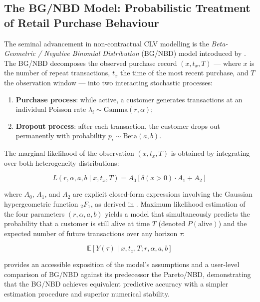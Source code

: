 \subsection{The BG/NBD Model: Probabilistic Treatment of Retail Purchase Behaviour}

The seminal advancement in non-contractual CLV modelling is the \textit{Beta-Geometric / Negative Binomial Distribution} (BG/NBD) model introduced by \cite{FaderHardieLee2005}. The BG/NBD decomposes the observed purchase record $(x, t_x, T)$ — where $x$ is the number of repeat transactions, $t_x$ the time of the most recent purchase, and $T$ the observation window — into two interacting stochastic processes:

\begin{enumerate}[noitemsep]
    \item \textbf{Purchase process}: while active, a customer generates transactions at an individual Poisson rate $\lambda_i \sim \text{Gamma}(r, \alpha)$;
    \item \textbf{Dropout process}: after each transaction, the customer drops out permanently with probability $p_i \sim \text{Beta}(a, b)$.
\end{enumerate}

The marginal likelihood of the observation $(x, t_x, T)$ is obtained by integrating over both heterogeneity distributions:

\begin{equation}
    L(r, \alpha, a, b \mid x, t_x, T) = A_0 \left[ \delta(x > 0) \cdot A_1 + A_2 \right]
    \label{eq:bgnbd_lik}
\end{equation}

where $A_0$, $A_1$, and $A_2$ are explicit closed-form expressions involving the Gaussian hypergeometric function ${}_2F_1$, as derived in \cite{FaderHardieLee2005}. Maximum likelihood estimation of the four parameters $(r, \alpha, a, b)$ yields a model that simultaneously predicts the probability that a customer is still alive at time $T$ (denoted $P(\text{alive})$) and the expected number of future transactions over any horizon $\tau$:

\begin{equation}
    \mathbb{E}[Y(\tau) \mid x, t_x, T; r, \alpha, a, b]
    \label{eq:bgnbd_expectation}
\end{equation}

\cite{CLVToolsExplanation2021} provides an accessible exposition of the model's assumptions and a user-level comparison of BG/NBD against its predecessor the Pareto/NBD, demonstrating that the BG/NBD achieves equivalent predictive accuracy with a simpler estimation procedure and superior numerical stability.

